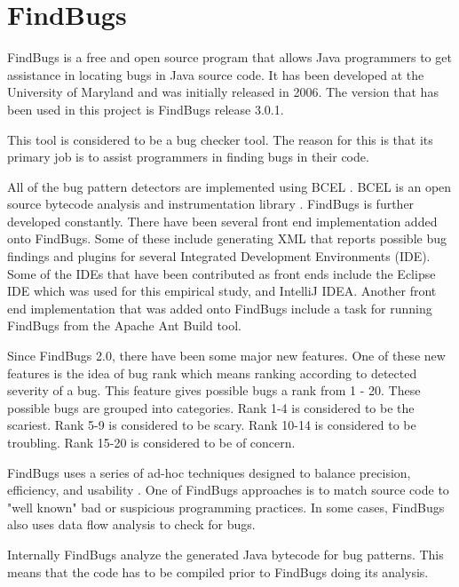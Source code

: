 \chapter{FindBugs}\label{ch:FindBugs}

FindBugs is a free and open source program that allows Java programmers to get assistance in locating bugs in Java source code. It has been developed at the University of Maryland and was initially released in 2006. The version that has been used in this project is FindBugs release 3.0.1.

This tool is considered to be a bug checker tool. The reason for this is that its primary job is to assist programmers in finding bugs in their code.

All of the bug pattern detectors are implemented using BCEL \cite{apache_commons_bcel-2004}. BCEL is an open source bytecode analysis and instrumentation library \cite{Hovemeyer:2004:FBE:1028664.1028717}. FindBugs is further developed constantly. There have been several front end implementation added onto FindBugs. Some of these include generating XML that reports possible bug findings and plugins for several Integrated Development Environments (IDE). Some of the IDEs  that have been contributed as front ends include the Eclipse IDE which was used for this empirical study, and IntelliJ IDEA. Another front end implementation that was added onto FindBugs include a task for running FindBugs from the Apache Ant Build tool.

Since FindBugs 2.0, there have been some major new features. One of these new features is the idea of bug rank which means ranking according to detected severity of a bug. This feature gives possible bugs a rank from 1 - 20. These possible bugs are grouped into categories. Rank 1-4 is considered to be the scariest. Rank 5-9 is considered to be scary. Rank 10-14 is considered to be troubling. Rank 15-20 is considered to be of concern. 
 
FindBugs uses a series of ad-hoc techniques designed to balance precision, efficiency, and usability \cite{bugFindingTools}. One of FindBugs approaches is to match source code to "well known" bad or suspicious programming practices. In some cases, FindBugs also uses data flow analysis to check for bugs.

Internally FindBugs analyze the generated Java bytecode for bug patterns. This means that the code has to be compiled prior to FindBugs doing its analysis. 

